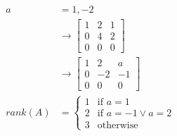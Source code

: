 \documentclass[letterpaper, 12pt]{math}
\begin{document}
\begin{align*}
  a &= 1, -2 \\
  &\to \begin{bmatrix}
    1 & 2 & 1 \\
    0 & 4 & 2 \\
    0 & 0 & 0
  \end{bmatrix} \\
  &\to \begin{bmatrix}
    1 & 2 & a \\
    0 & -2 & -1 \\
    0 & 0 & 0
  \end{bmatrix} \\
  rank(A) &= \begin{cases}
    1 & \text{if } a = 1 \\
    2 & \text{if } a = -1 \vee a = 2 \\
    3 & \text{otherwise}
  \end{cases}
\end{align*}
\end{document}
